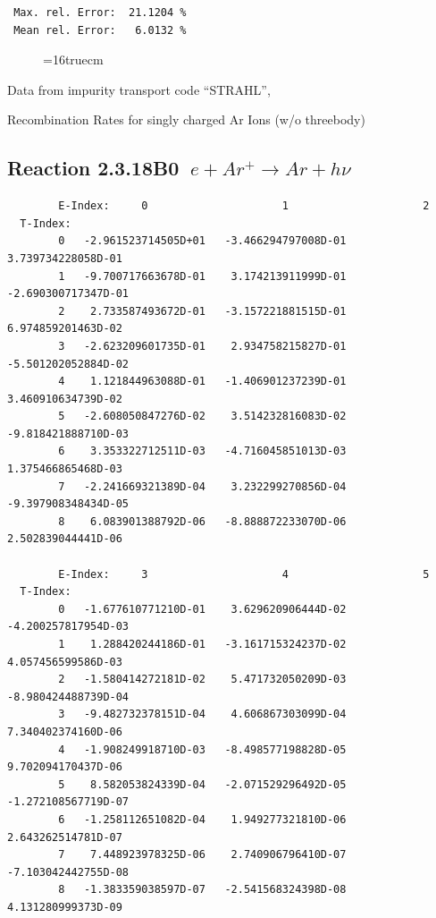 \documentclass[12pt,dvips]{article}
\begin{document}
\begin{small}
\begin{verbatim}
 Max. rel. Error:  21.1204 %
 Mean rel. Error:   6.0132 %

\end{verbatim}\end{small}
\begin{figure} \label{2.3.10B1}
\epsfxsize=16truecm
\end{figure}
\newpage
Data from impurity transport code ``STRAHL'', \cite{kn:Behringer}

  Recombination Rates for singly  charged Ar Ions (w/o threebody)
\subsection{
Reaction 2.3.18B0  $ \  e + Ar^+ \rightarrow  Ar + h\nu $
}


\begin{small}\begin{verbatim}
        E-Index:     0                     1                     2
  T-Index:
        0   -2.961523714505D+01   -3.466294797008D-01    3.739734228058D-01
        1   -9.700717663678D-01    3.174213911999D-01   -2.690300717347D-01
        2    2.733587493672D-01   -3.157221881515D-01    6.974859201463D-02
        3   -2.623209601735D-01    2.934758215827D-01   -5.501202052884D-02
        4    1.121844963088D-01   -1.406901237239D-01    3.460910634739D-02
        5   -2.608050847276D-02    3.514232816083D-02   -9.818421888710D-03
        6    3.353322712511D-03   -4.716045851013D-03    1.375466865468D-03
        7   -2.241669321389D-04    3.232299270856D-04   -9.397908348434D-05
        8    6.083901388792D-06   -8.888872233070D-06    2.502839044441D-06

        E-Index:     3                     4                     5
  T-Index:
        0   -1.677610771210D-01    3.629620906444D-02   -4.200257817954D-03
        1    1.288420244186D-01   -3.161715324237D-02    4.057456599586D-03
        2   -1.580414272181D-02    5.471732050209D-03   -8.980424488739D-04
        3   -9.482732378151D-04    4.606867303099D-04    7.340402374160D-06
        4   -1.908249918710D-03   -8.498577198828D-05    9.702094170437D-06
        5    8.582053824339D-04   -2.071529296492D-05   -1.272108567719D-07
        6   -1.258112651082D-04    1.949277321810D-06    2.643262514781D-07
        7    7.448923978325D-06    2.740906796410D-07   -7.103042442755D-08
        8   -1.383359038597D-07   -2.541568324398D-08    4.131280999373D-09


\end{verbatim}
\end{small}
\end{document}
